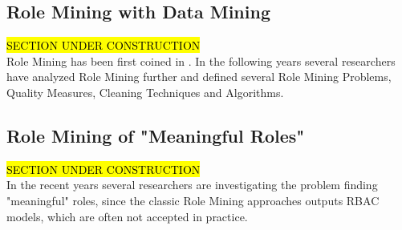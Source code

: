 \subsection{Role Mining with Data Mining}
\hl{SECTION UNDER CONSTRUCTION}\\
Role Mining has been first coined in \cite{Kuhlmann}. In the following years several researchers have analyzed Role Mining further and defined several Role Mining Problems, Quality Measures, Cleaning Techniques and Algorithms.
\subsection{Role Mining of "Meaningful Roles"}
\label{sec:meaningfulRoles}
\hl{SECTION UNDER CONSTRUCTION}\\
In the recent years several researchers are investigating the problem finding "meaningful" roles, since the classic Role Mining approaches outputs RBAC models, which are often not accepted in practice.\\
\cite{Xu}
